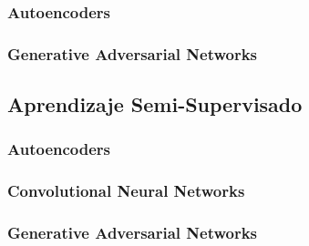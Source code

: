 \subsubsection{Autoencoders}
\subsubsection{Generative Adversarial Networks}

\subsection{Aprendizaje Semi-Supervisado}
\subsubsection{Autoencoders}
\subsubsection{Convolutional Neural Networks}
\subsubsection{Generative Adversarial Networks}
